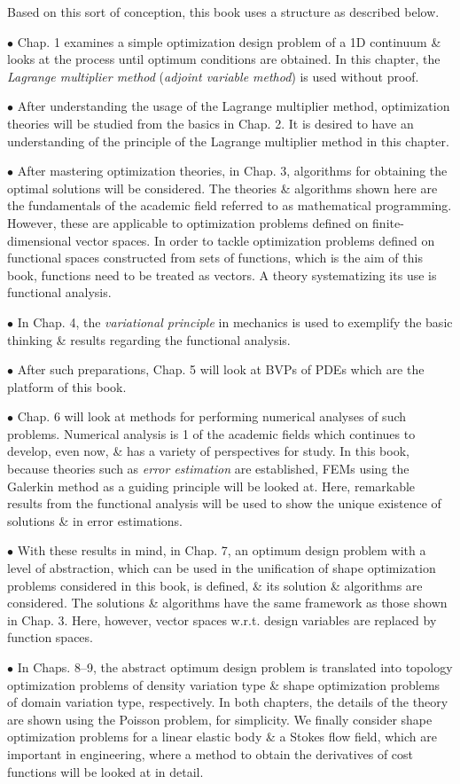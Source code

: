 \documentclass[oneside]{book}
\numberwithin{equation}{section}
\begin{document}
Based on this sort of conception, this book uses a structure as described below.
\begin{enumerate*}
	\item[$\bullet$] Chap. 1 examines a simple optimization design problem of a 1D continuum \& looks at the process until optimum conditions are obtained. In this chapter, the \textit{Lagrange multiplier method} (\textit{adjoint variable method}) is used without proof.
	\item[$\bullet$] After understanding the usage of the Lagrange multiplier method, optimization theories will be studied from the basics in Chap. 2. It is desired to have an understanding of the principle of the Lagrange multiplier method in this chapter.
	\item[$\bullet$] After mastering optimization theories, in Chap. 3, algorithms for obtaining the optimal solutions will be considered. The theories \& algorithms shown here are the fundamentals of the academic field referred to as mathematical programming. However, these are applicable to optimization problems defined on finite-dimensional vector spaces. In order to tackle optimization problems defined on functional spaces constructed from sets of functions, which is the aim of this book, functions need to be treated as vectors. A theory systematizing its use is functional analysis.
	\item[$\bullet$] In Chap. 4, the \textit{variational principle} in mechanics is used to exemplify the basic thinking \& results regarding the functional analysis.
	\item[$\bullet$] After such preparations, Chap. 5 will look at BVPs of PDEs which are the platform of this book.
	\item[$\bullet$] Chap. 6 will look at methods for performing numerical analyses of such problems. Numerical analysis is 1 of the academic fields which continues to develop, even now, \& has a variety of perspectives for study. In this book, because theories such as \textit{error estimation} are established, FEMs using the Galerkin method as a guiding principle will be looked at. Here, remarkable results from the functional analysis will be used to show the unique existence of solutions \& in error estimations.
	\item[$\bullet$] With these results in mind, in Chap. 7, an optimum design problem with a level of abstraction, which can be used in the unification of shape optimization problems considered in this book, is defined, \& its solution \& algorithms are considered. The solutions \& algorithms have the same framework as those shown in Chap. 3. Here, however, vector spaces w.r.t. design variables are replaced by function spaces.
	\item[$\bullet$] In Chaps. 8--9, the abstract optimum design problem is translated into topology optimization problems of density variation type \& shape optimization problems of domain variation type, respectively. In both chapters, the details of the theory are shown using the Poisson problem, for simplicity. We finally consider shape optimization problems for a linear elastic body \& a Stokes flow field, which are important in engineering, where a method to obtain the derivatives of cost functions will be looked at in detail.
\end{enumerate*}
\end{document}
